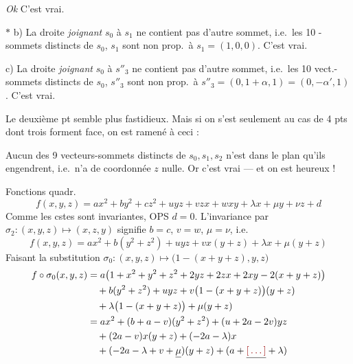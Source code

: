 \documentclass[11pt,a4paper]{article}
\begin{document}
\emph{Ok} C'est vrai.

$\ast$ b) La droite \emph{joignant} $s_0$ à $s_1$ ne contient pas d'autre sommet, i.e.\ les 10 -sommets distincts de $s_0$, $s_1$ sont non prop.\ à $s_1 = (1, 0, 0)$. C'est vrai.

c) La droite \emph{joignant} $s_0$ à $s''_3$ ne contient pas d'autre sommet, i.e.\ les 10 vect.-sommets distincts de $s_0$, $s''_3$ sont non prop.\ à $s''_3 = (0, 1 + \alpha, 1) = (0, -\alpha', 1)$. C'est vrai.

Le deuxième pt semble plus fastidieux. Mais si on s'est seulement  au cas de 4 pts  dont trois forment face, on est ramené à ceci :

Aucun des 9 vecteurs-sommets distincts de $s_0, s_1, s_2$ n'est dans le plan qu'ils engendrent, i.e.\ n'a de coordonnée $z$ nulle. Or c'est vrai --- et on est heureux !

Fonctions \struck{\ill{}} quadr.\ 
\[ f(x, y, z) = ax^2 + by^2 + cz^2 + uyz + vzx + wxy + \lambda x + \mu y + \nu z + d \]
Comme les cstes sont invariantes, OPS $d = 0$. L'invariance par $\sigma_2 : (x, y, z) \mapsto (x, z, y)$ signifie $b = c$, $v = w$, $\mu = \nu$, i.e.
\[ f(x, y, z) = ax^2 + b(y^2 + z^2) + uyz + vx(y + z) + \lambda x + \mu(y + z) \]
Faisant la substitution $\sigma_0 : (x, y, z) \mapsto \bigl(1 - (x + y + z), y, z\bigr)$
\begin{align*}
f \circ \sigma_0(x, y, z) &= a\bigl(1 + x^2 + y^2 + z^2 + 2yz + 2zx + 2xy - 2(x + y + z)\bigr) \\
&\quad + b(y^2 + z^2) + uyz + v\bigl(1 - (x + y + z)\bigr)(y + z) \\
&\quad + \lambda\bigl(1 - (x + y + z)\bigr) + \mu(y + z) \\
&= ax^2 + (b + a - v)(y^2 + z^2) + (u + 2a - 2v)yz \\
&\quad + (2a - v)x(y + z) + (-2a - \lambda)x \\
&\quad + (-2a - \lambda + v + \struck{\mu})(y + z) + (a + \struck{\ill{}} + \lambda)
\end{align*}
\end{document}
